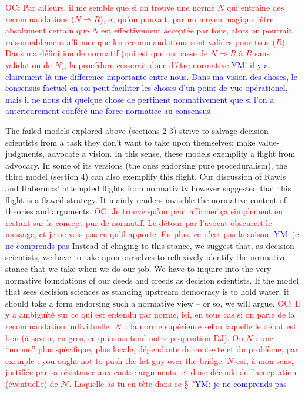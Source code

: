 \documentclass[preprint, french, english, 11pt]{elsarticle}%
\newcommand{\commentYM}[1]{\textcolor{blue}{YM: #1}}
\newcommand{\commentOC}[1]{\textcolor{red}{OC: #1}}
\begin{document}
\commentOC{Par ailleurs, il me semble que si on trouve une norme $N$ qui entraine des recommandations ($N ⇒ R$), et qu’on pouvait, par un moyen magique, être absolument certain que $N$ est effectivement acceptée par tous, alors on pourrait raisonnablement affirmer que les recommandations sont valides pour tous ($R$). Dans ma définition de normatif (qui est que on passe de $N ⇒ R$ à $R$ sans validation de $N$), la procédure cesserait donc d’être normative.}\commentYM{il y a clairement là une difference importante entre nous. Dans ma vision des choses, le consensus factuel en soi peut faciliter les choses d'un point de vue opérationel, mais il ne nous dit quelque chose de pertinent normativement que si l'on a anterieurement conféré une force normatice au consensus} 

The failed models explored above (sections 2-3) strive to salvage decision scientists from a task they don’t want to take upon themselves: make value-judgments, advocate a vision. In this sense, these models exemplify a flight from advocacy. In some of its versions (the ones endorsing pure proceduralism), the third model (section 4) can also exemplify this flight. 
Our discussion of Rawls' and Habermas' attempted flights from normativity however suggested that this flight is a flawed strategy. It mainly renders invisible the normative content of theories and arguments. 
\commentOC{Je trouve qu’on peut affirmer ça simplement en restant sur le concept pur de normatif. Le détour par l’avocat obscurcit le message, et je ne vois pas ce qu’il apporte. En plus, ce n’est pas la saison.} \commentYM{je ne comprends pas}
Instead of clinging to this stance, we suggest that, as decision scientists, we have to take upon ourselves to reflexively identify the normative stance that we take when we do our job. We have to inquire into the very normative foundations of our deeds and creeds as decision scientists. If the model that sees decision sciences as standing upstream democracy is to hold water, it should take a form endorsing such a normative view -- or so, we will argue.
\commentOC{Il y a ambiguïté sur ce qui est entendu par norme, ici, en tous cas si on parle de la recommandation individuelle. $\mathscr{N}$ : la norme supérieure selon laquelle \og{}le débat est bon\fg{} (à savoir, en gros, ce qui sous-tend notre proposition DJ). Ou $N$ : une “norme” plus spécifique, plus locale, dépendante du contexte et du problème, par exemple : \og{}you ought not to push the fat guy over the bridge\fg{}. $N$ est, à mon sens, justifiée par sa résistance aux contre-arguments, et donc découle de l’acceptation (éventuelle) de $\mathscr{N}$. Laquelle as-tu en tête dans ce § ?}\commentYM{je ne comprends pas}
\end{document}

